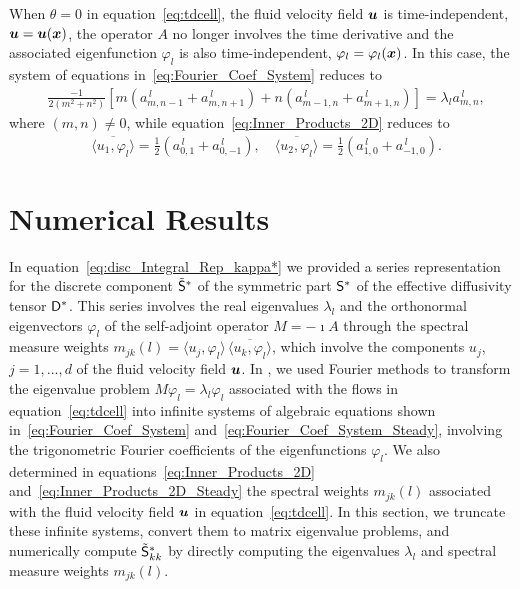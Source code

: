 \documentclass[amsa]{ipart}
\begin{document}
When $\theta=0$ in equation~\eqref{eq:tdcell}, the fluid velocity field
$\boldsymbol{u}$ is time-independent, $\boldsymbol{u}=\boldsymbol{u}(\boldsymbol{x})$, the operator $A$ no
longer involves the time derivative and the associated eigenfunction
$\varphi_l$ is also time-independent, $\varphi_l=\varphi_l(\boldsymbol{x})$. In this case, the system
of equations in~\eqref{eq:Fourier_Coef_System} reduces to 
%
\begin{align}\label{eq:Fourier_Coef_System_Steady}
  &\frac{-1}{2(m^2+n^2)}\left[m(a^{\,l}_{m,n-1}+a^{\,l}_{m,n+1})+n(a^{\,l}_{m-1,n}+a^{\,l}_{m+1,n})\right]
  =\lambda_la^{\,l}_{m,n},
\end{align}
%
where $(m,n)\neq0$, while equation~\eqref{eq:Inner_Products_2D} reduces
to  
%
\begin{align}\label{eq:Inner_Products_2D_Steady}
  &\overline{\langle u_1,\varphi_l\rangle}=\frac{1}{2}\left(a^{\,l}_{0,1}+a^{\,l}_{0,-1}\right),
  \quad
  \overline{\langle u_2,\varphi_l\rangle}=\frac{1}{2}\left(a^{\,l}_{1,0}+a^{\,l}_{-1,0}\right).
\end{align}
%







\section{Numerical Results}\label{sec:Num_Results}
%
In equation~\eqref{eq:disc_Integral_Rep_kappa*} we provided a series
representation for the discrete component $\tilde{\mathsf{S}}^*$ of the
symmetric part $\mathsf{S}^*$ of the effective diffusivity tensor
$\mathsf{D}^*$. This series involves 
the real eigenvalues $\lambda_l$ and the orthonormal eigenvectors $\varphi_l$ of
the self-adjoint operator $M=-\imath A$ through the spectral measure weights
$m_{jk}(l)=\langle u_j,\varphi_l\rangle\,\overline{\langle u_k,\varphi_l\rangle}$, which involve the
components $u_j$, $j=1,\ldots,d$ of the fluid velocity field $\boldsymbol{u}$. In
, we used Fourier methods to transform the
eigenvalue problem $M\varphi_l=\lambda_l\varphi_l$ associated with the flows in
equation~\eqref{eq:tdcell} into infinite systems of algebraic
equations shown in~\eqref{eq:Fourier_Coef_System}
and~\eqref{eq:Fourier_Coef_System_Steady}, involving the trigonometric
Fourier coefficients of the eigenfunctions $\varphi_l$. We also determined 
in equations~\eqref{eq:Inner_Products_2D}  
and~\eqref{eq:Inner_Products_2D_Steady} the spectral weights
$m_{jk}(l)$ associated with  the fluid velocity 
field $\boldsymbol{u}$ in equation~\eqref{eq:tdcell}. In this section, we
truncate these infinite systems, convert them to matrix eigenvalue
problems, and numerically compute $\tilde{\mathsf{S}}^*_{kk}$ by
directly computing the eigenvalues $\lambda_l$ and spectral measure weights 
$m_{jk}(l)$.  
\end{document}

